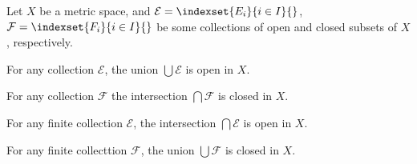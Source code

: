 \begin{observation}
    \label{obv:opensetop}
    Let \(X\) be a metric space,
    and \(\mathcal E=\indexset{E_i}{i\in I}{}\),
    \(\mathcal F=\indexset{F_i}{i\in I}{}\)
    be some collections of open and closed subsets of \(X\),
    respectively.
    \begin{nlist}
        \item For any collection \(\mathcal E\),
        the union \(\bigcup\mathcal E\) is open in \(X\).
        
        \item For any collection \(\mathcal F\)
        the intersection \(\bigcap\mathcal F\) is closed in \(X\).
        
        \item For any finite collection \(\mathcal E\),
        the intersection \(\bigcap\mathcal E\) is open in \(X\).

        \item For any finite collecttion \(\mathcal F\),
        the union \(\bigcup\mathcal F\) is closed in \(X\).
    \end{nlist}
\end{observation}
